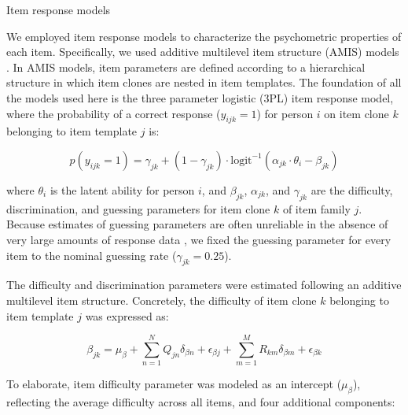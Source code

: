 \documentclass[a4paper,man,natbib,noextraspace]{apa6}
\makeatletter
\renewcommand{\subsubsection}{\@startsection{subsubsection}{3}
  {\z@}%
  {\b@level@two@skip}{\e@level@two@skip}%
  {\normalfont\normalsize\bfseries}}
\makeatother
\begin{document}
\subsubsection{Item response models}

We employed item response models to characterize the psychometric properties of each item. Specifically, we used additive multilevel item structure (AMIS) models \citep{geerlings2011modeling, cho2014additive, lathrop2017item}. In AMIS models, item parameters are defined according to a hierarchical structure in which item clones are nested in item templates. The foundation of all the models used here is the three parameter logistic (3PL) item response model, where the probability of a correct response ($y_{ijk} = 1$) for person $i$ on item clone $k$ belonging to item template $j$ is:

\begin{equation} \label{eq:1}
p(y_{ijk} = 1) = \gamma_{jk} + (1-\gamma_{jk}) \cdot \text{logit}^{-1} \left( \alpha_{jk} \cdot \theta_i - \beta_{jk} \right)
\end{equation}

\noindent where $\theta_i$ is the latent ability for person $i$, and $\beta_{jk}$, $\alpha_{jk}$, and $\gamma_{jk}$ are the difficulty, discrimination, and guessing parameters for item clone $k$ of item family $j$. Because estimates of guessing parameters are often unreliable in the absence of very large amounts of response data \citep{han2012fixing}, we fixed the guessing parameter for every item to the nominal guessing rate ($\gamma_{jk} = 0.25$).

The difficulty and discrimination parameters were estimated following an additive multilevel item structure. Concretely, the difficulty of item clone $k$ belonging to item template $j$ was expressed as:  

\begin{equation}
\beta_{jk} = \mu_\beta + \sum_{n=1}^N Q_{jn} \delta_{\beta n} + \epsilon_{\beta j} + \sum_{m=1}^M R_{km} \delta_{\beta m} + \epsilon_{\beta k}
\end{equation}

\noindent To elaborate, item difficulty parameter was modeled as an intercept ($\mu_\beta$), reflecting the average difficulty across all items, and four additional components:
\end{document}
